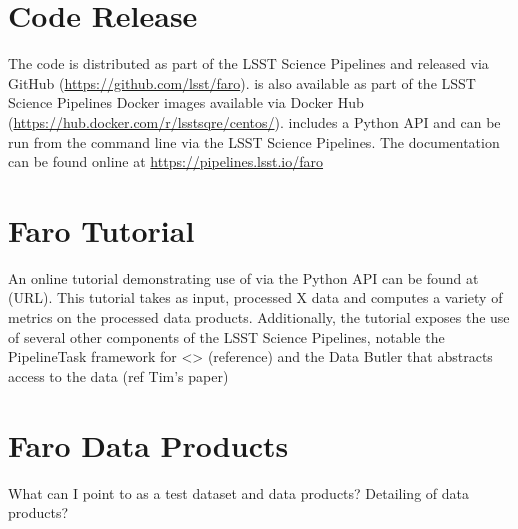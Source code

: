 \section{Code Release}
The \faro code is distributed as part of the LSST Science Pipelines and released via GitHub (\url{https://github.com/lsst/faro}). 
\faro is also available as part of the LSST Science Pipelines Docker images available via Docker Hub (\url{https://hub.docker.com/r/lsstsqre/centos/}).
\faro includes a Python API and can be run from the command line via the LSST Science Pipelines. 
The documentation can be found online at \url{https://pipelines.lsst.io/faro}

\section{Faro Tutorial}
An online tutorial demonstrating use of \faro via the Python API can be found at (URL).
This tutorial takes as input, processed X data and computes a variety of metrics on the processed data products. 
Additionally, the tutorial exposes the use of several other components of the LSST Science Pipelines, notable the PipelineTask framework for <> (reference) and the Data Butler that abstracts access to the data  (ref Tim's paper)

\section{Faro Data Products}
What can I point to as a test dataset and data products? 
Detailing of data products? 

